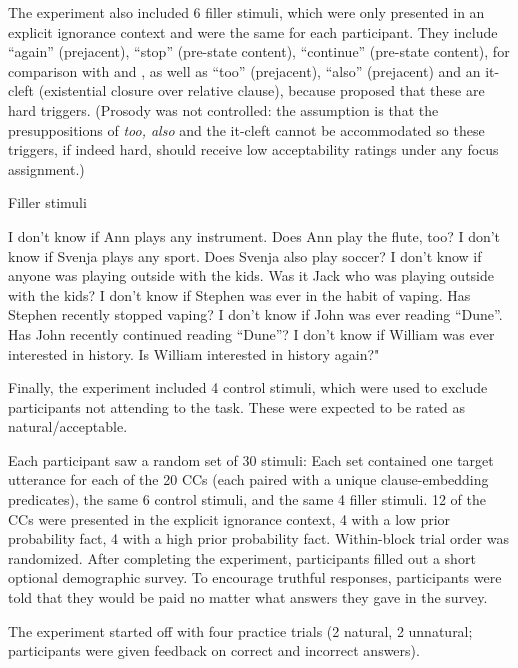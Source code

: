 \documentclass[11pt,fleqn]{article}
\newcommand{\6}{\mbox{$[\hspace*{-.6mm}[$}}
\newcommand{\9}{\mbox{$]\hspace*{-.6mm}]$}}
\begin{document}
The experiment also included 6 filler stimuli, which were only presented in an explicit ignorance context and were the same for each participant. They include ``again'' (prejacent), ``stop'' (pre-state content), ``continue'' (pre-state content), for comparison with \citealt{mandelkern-etal2020} and \citealt{kalomoiros-schwarz2021}, as well as ``too'' (prejacent), ``also'' (prejacent) and an it-cleft (existential closure over relative clause), because \citealt{abusch10} proposed that these are hard triggers. (Prosody was not controlled: the assumption is that the  presuppositions of {\em too, also} and the it-cleft cannot be accommodated so these triggers, if indeed hard, should receive low acceptability ratings under any focus assignment.)

\begin{exe}
\ex Filler stimuli
\begin{xlist}
\ex I don't know if Ann plays any instrument. Does Ann play the flute, too?
\ex I don't know if Svenja plays any sport. Does Svenja also play soccer?
\ex I don't know if anyone was playing outside with the kids. Was it Jack who was playing outside with the kids?
\ex I don't know if Stephen was ever in the habit of vaping. Has Stephen recently stopped vaping?
\ex I don't know if John was ever reading ``Dune''. Has John recently continued reading ``Dune''?
\ex I don't know if William was ever interested in history. Is William interested in history again?"
\end{xlist}
\end{exe}

Finally, the experiment included 4 control stimuli, which were used to exclude participants not attending to the task. These were expected to be rated as natural/acceptable.

Each participant saw a random set of 30 stimuli: Each set contained one target utterance for each of the 20 CCs (each paired with a unique clause-embedding predicates), the same 6 control stimuli, and the same 4  filler stimuli. 12 of the CCs were presented in the explicit ignorance context, 4 with a low prior probability fact, 4 with a high prior probability fact. Within-block trial order was randomized. After completing the experiment, participants filled out a short optional demographic survey. To encourage truthful responses, participants were told that they would be paid no matter what answers they gave in the survey.

The experiment started off with four practice trials (2 natural, 2 unnatural; participants were given feedback on correct and incorrect answers).
\end{document}
